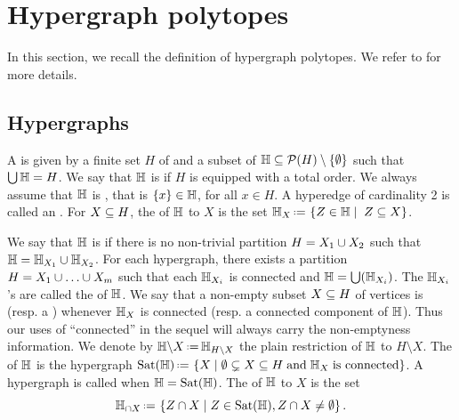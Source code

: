 
\section{Hypergraph polytopes} 
\label{s:hypergraph}

In this section, we recall the definition of hypergraph polytopes. 
We refer to \cite{DP-HP,COI} for more details. 


\subsection{Hypergraphs}
A  is given by a finite set $H$ of  and a subset of  ${\mathbb H}\subseteq {\cal P}(H)\setminus\{\emptyset\}$ such that $\bigcup {\mathbb H}=H$. 
We say that ${\mathbb H}$ is  if $H$ is equipped with a total order.
We always assume that ${\mathbb H}$ is , that is $\left\{x\right\}\in {\mathbb H}$, for all $x\in H$. 
A hyperedge of cardinality 2 is called an .  
For $X\subseteq H$, the  of ${\mathbb H}$ to $X$ is the set 
$\hyper{H}_X \eqdef   \setc{Z\in \hyper{H}}{\; Z\inc X}$.

We say that ${\mathbb H}$ is  if there is no non-trivial partition $H=X_1\cup X_2$ such that ${\mathbb H}={\mathbb H}_{X_1}\cup {\mathbb H}_{X_2}$. 
For each hypergraph, there exists a partition $H=X_1\cup\ldots\cup X_m$ such that each ${\mathbb H}_{X_i}$ is connected and ${\mathbb H}=\bigcup({\mathbb H}_{X_i})$.  
The ${\mathbb H}_{X_i}$'s are called the  of ${\mathbb H}$.
We say that a non-empty subset $X\subseteq H$ of vertices is  (resp. a ) whenever ${\mathbb H}_X$ is connected (resp. a connected component of ${\mathbb H}$).  Thus our uses of ``connected'' in the sequel will always carry the non-emptyness information.
We denote by $\restrH{H}{X}\eqdef  \hyper{H}_{H\setminus X}$ the plain restriction of ${\mathbb H}$ to $H \setminus X$.
The  of ${\mathbb H}$ is the hypergraph
$\Sat(\hyper{H})\eqdef  \setc{X}{\emptyset\incs X\inc H\;\mbox{and}\;\hyper{H}_X\;\mbox{is connected}}$.
A hypergraph is called  when ${\mathbb H}=\mathrm{Sat}({\mathbb H})$.  
The  of ${\mathbb H}$ to $X$ is the set $$\recrestr{\hyper{H}}{X}\eqdef  \setc{Z\cap X}{Z\in \Sat(\hyper{H}), Z\cap X\neq\emptyset}.$$


